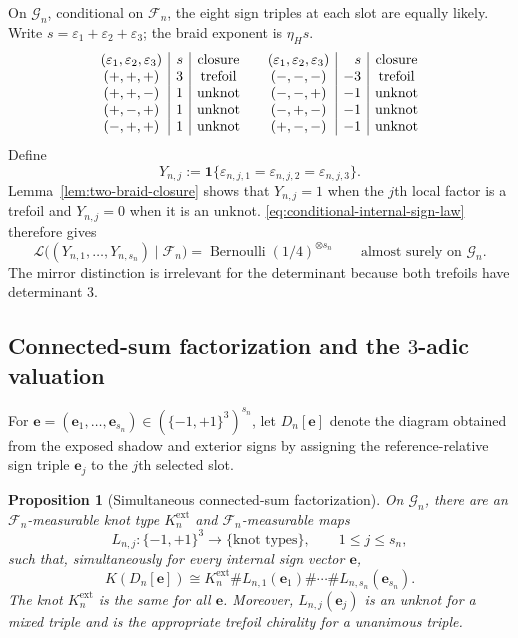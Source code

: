 \documentclass[9pt,twoside]{pnas-new}
\newtheorem{proposition}[theorem]{Proposition}
\theoremstyle{definition}
\theoremstyle{remark}
\begin{document}
On $\mathcal G_n$, conditional on $\mathcal F_n$, the eight sign triples at each slot are equally likely. Write $s=\varepsilon_1+\varepsilon_2+\varepsilon_3$; the braid exponent is $\eta_Hs$.
\[
\begin{array}{c|r|c@{\qquad}c|r|c}
(\varepsilon_1,\varepsilon_2,\varepsilon_3)&s&\text{closure}
 &(\varepsilon_1,\varepsilon_2,\varepsilon_3)&s&\text{closure}\\
(+,+,+)& 3&\text{trefoil}&(-,-,-)&-3&\text{trefoil}\\
(+,+,-)& 1&\text{unknot}&(-,-,+)&-1&\text{unknot}\\
(+,-,+)& 1&\text{unknot}&(-,+,-)&-1&\text{unknot}\\
(-,+,+)& 1&\text{unknot}&(+,-,-)&-1&\text{unknot}
\end{array}
\]
Define
\[
 Y_{n,j}:=\mathbf 1\{\varepsilon_{n,j,1}=\varepsilon_{n,j,2}=\varepsilon_{n,j,3}\}.
\]
Lemma~\ref{lem:two-braid-closure} shows that $Y_{n,j}=1$ when the $j$th local factor is a trefoil and $Y_{n,j}=0$ when it is an unknot. \eqref{eq:conditional-internal-sign-law} therefore gives
\begin{equation}
 \mathcal L\bigl((Y_{n,1},\ldots,Y_{n,s_n})\mid\mathcal F_n\bigr)
 =\operatorname{Bernoulli}(1/4)^{\otimes s_n}
 \qquad\text{almost surely on }\mathcal G_n.
 \label{eq:local-bernoulli}
\end{equation}
The mirror distinction is irrelevant for the determinant because both trefoils have determinant $3$.

\subsection{Connected-sum factorization and the \texorpdfstring{$3$}{3}-adic valuation}
For $\mathbf e=(\mathbf e_1,\ldots,\mathbf e_{s_n})\in(\{-1,+1\}^3)^{s_n}$, let $D_n[\mathbf e]$ denote the diagram obtained from the exposed shadow and exterior signs by assigning the reference-relative sign triple $\mathbf e_j$ to the $j$th selected slot.

\begin{proposition}[Simultaneous connected-sum factorization]
\label{prop:persistent-factorization}
On $\mathcal G_n$, there are an $\mathcal F_n$-measurable knot type $K_n^{\mathrm{ext}}$ and $\mathcal F_n$-measurable maps
\[
 L_{n,j}:\{-1,+1\}^3\longrightarrow\{\text{knot types}\},
 \qquad 1\le j\le s_n,
\]
such that, simultaneously for every internal sign vector $\mathbf e$,
\begin{equation}
 K(D_n[\mathbf e])
 \cong
 K_n^{\mathrm{ext}}\#L_{n,1}(\mathbf e_1)\#\cdots\#L_{n,s_n}(\mathbf e_{s_n}).
 \label{eq:si-factorization}
\end{equation}
The knot $K_n^{\mathrm{ext}}$ is the same for all $\mathbf e$.  Moreover, $L_{n,j}(\mathbf e_j)$ is an unknot for a mixed triple and is the appropriate trefoil chirality for a unanimous triple.
\end{proposition}
\end{document}
